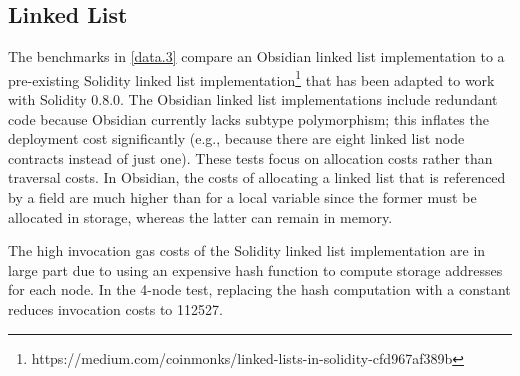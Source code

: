 \subsection{Linked List}

%

The benchmarks in \cref{data.3} compare an Obsidian linked list implementation to a pre-existing Solidity linked list implementation\footnote{https://medium.com/coinmonks/linked-lists-in-solidity-cfd967af389b} that has been adapted to work with Solidity 0.8.0. The Obsidian linked list implementations include redundant code because Obsidian currently lacks subtype polymorphism; this inflates the deployment cost significantly (e.g., because there are eight linked list node contracts instead of just one). These tests focus on allocation costs rather than traversal costs. In Obsidian, the costs of allocating a linked list that is referenced by a field are much higher than for a local variable since the former must be allocated in storage, whereas the latter can remain in memory.

The high invocation gas costs of the Solidity linked list implementation are in large part due to using an expensive hash function to compute storage addresses for each node. In the 4-node test, replacing the hash computation with a constant reduces invocation costs to 112527. 


